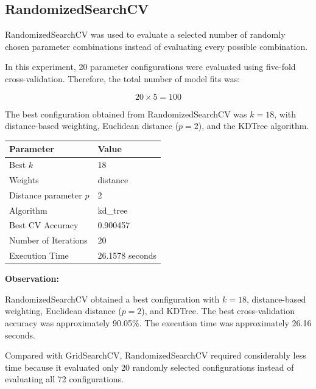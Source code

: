 \documentclass[12pt,a4paper]{article}
\begin{document}
\subsection{RandomizedSearchCV}

RandomizedSearchCV was used to evaluate a selected number of randomly
chosen parameter combinations instead of evaluating every possible
combination.

In this experiment, 20 parameter configurations were evaluated using
five-fold cross-validation. Therefore, the total number of model fits
was:

\[
20 \times 5 = 100
\]

The best configuration obtained from RandomizedSearchCV was $k=18$,
with distance-based weighting, Euclidean distance ($p=2$), and the
KDTree algorithm.

\begin{longtable}{|p{6cm}|p{7cm}|}
\hline
\textbf{Parameter} & \textbf{Value} \\ \hline

Best $k$ & 18 \\ \hline

Weights & distance \\ \hline

Distance parameter $p$ & 2 \\ \hline

Algorithm & kd\_tree \\ \hline

Best CV Accuracy & 0.900457 \\ \hline

Number of Iterations & 20 \\ \hline

Execution Time & 26.1578 seconds \\ \hline

\end{longtable}

\textbf{Observation:}

RandomizedSearchCV obtained a best configuration with $k=18$,
distance-based weighting, Euclidean distance ($p=2$), and KDTree.
The best cross-validation accuracy was approximately 90.05\%.
The execution time was approximately 26.16 seconds.

Compared with GridSearchCV, RandomizedSearchCV required considerably
less time because it evaluated only 20 randomly selected
configurations instead of evaluating all 72 configurations.

\end{document}

